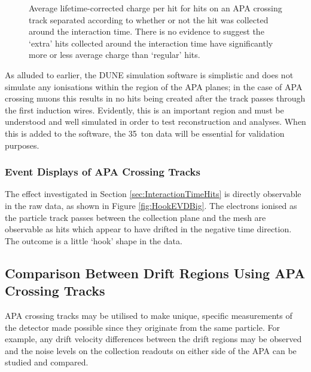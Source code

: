 \begin{figure}
\begin{subfigure}[t]{0.48\linewidth}
    \label{fig:HitChargeNonInteraction}
  \end{subfigure}
  \caption[Average lifetime-corrected charge per hit for hits on an APA crossing track separated according to whether or not the hit was collected around the interaction time.]{Average lifetime-corrected charge per hit for hits on an APA crossing track separated according to whether or not the hit was collected around the interaction time.  There is no evidence to suggest the `extra' hits collected around the interaction time have significantly more or less average charge than `regular' hits.}
  \label{fig:HitCharges}
\end{figure}

As alluded to earlier, the DUNE simulation software is simplistic and does not simulate any ionisations within the region of the APA planes; in the case of APA crossing muons this results in no hits being created after the track passes through the first induction wires.  Evidently, this is an important region and must be understood and well simulated in order to test reconstruction and analyses.  When this is added to the software, the 35~ton data will be essential for validation purposes.

\subsubsection{Event Displays of APA Crossing Tracks}\label{sec:HookEVDs}

The effect investigated in Section \ref{sec:InteractionTimeHits} is directly observable in the raw data, as shown in Figure \ref{fig:HookEVDBig}.  The electrons ionised as the particle track passes between the collection plane and the mesh are observable as hits which appear to have drifted in the negative time direction.  The outcome is a little `hook' shape in the data.

\subsection{Comparison Between Drift Regions Using APA Crossing Tracks}\label{sec:APACrossingDriftComparison}

APA crossing tracks may be utilised to make unique, specific measurements of the detector made possible since they originate from the same particle.  For example, any drift velocity differences between the drift regions may be observed and the noise levels on the collection readouts on either side of the APA can be studied and compared.

